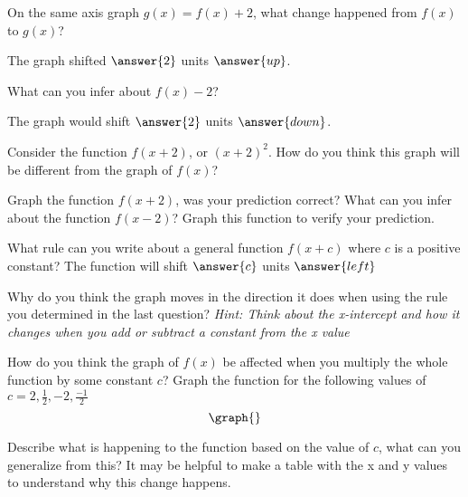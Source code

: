 \documentclass{ximera}
\begin{document}
\begin{question}

On the same axis graph $g(x)=f(x)+2$, what change happened from $f(x)$ to $g(x)$?

The graph shifted $\answer{2}$ units $\answer{up}$.

What can you infer about $f(x)-2$?

The graph would shift $\answer{2}$ units $\answer{down}$.

Consider the function $f(x+2)$, or $(x+2)^2$. How do you think this graph will be different from the graph of $f(x)$?
\begin{freeResponse}
\end{freeResponse}
Graph the function $f(x+2)$, was your prediction correct? What can you infer about the function $f(x-2)$? Graph this function to verify your prediction.
\begin{freeResponse}
\end{freeResponse}
What rule can you write about a general function $f(x+c)$ where $c$ is a positive constant?
The function will shift $\answer{c}$ units $\answer{left}$

Why do you think the graph moves in the direction it does when using the rule you determined in the last question? \textit{Hint: Think about the x-intercept and how it changes when you add or subtract a constant from the x value}
\begin{freeResponse}
\end{freeResponse}
How do you think the graph of $f(x)$ be affected when you multiply the whole function by some constant $c$? Graph the function for the following values of $c=2,\frac{1}{2},-2,\frac{-1}{2}$
\[
\graph{}
\]
\begin{freeResponse}
\end{freeResponse}
Describe what is happening to the function based on the value of $c$, what can you generalize from this? It may be helpful to make a table with the x and y values to understand why this change happens.
\begin{freeResponse}
\end{freeResponse}
\end{question}
\end{document}

